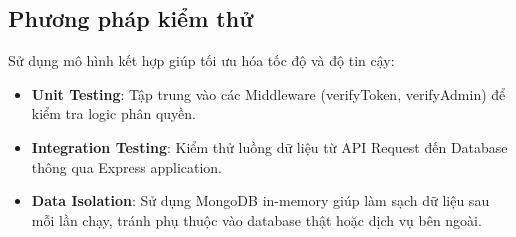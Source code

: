 \subsection{Phương pháp kiểm thử}
Sử dụng mô hình kết hợp giúp tối ưu hóa tốc độ và độ tin cậy:
\begin{itemize}
    \item[-] \textbf{Unit Testing}: Tập trung vào các Middleware (verifyToken, verifyAdmin) để kiểm tra logic phân quyền.
    \item[-] \textbf{Integration Testing}: Kiểm thử luồng dữ liệu từ API Request đến Database thông qua Express application.
    \item[-] \textbf{Data Isolation}: Sử dụng MongoDB in-memory giúp làm sạch dữ liệu sau mỗi lần chạy, tránh phụ thuộc vào database thật hoặc dịch vụ bên ngoài.
\end{itemize}

